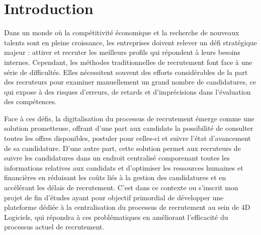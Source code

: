 \chapter*{Introduction}

Dans un monde où la compétitivité économique et la recherche 
de nouveaux talents sont en pleine croissance, les 
entreprises doivent relever un défi stratégique majeur : 
attirer et recruter les meilleurs profils qui répondent à 
leurs besoins internes. Cependant, les méthodes 
traditionnelles de recrutement font face à une série de 
difficultés. Elles nécessitent souvent des efforts 
considérables de la part des recruteurs pour examiner 
manuellement un grand nombre de candidatures, ce qui expose 
à des risques d'erreurs, de retards et d'imprécisions dans 
l'évaluation des compétences. 
\newline

Face à ces défis, la digitalisation du processus de recrutement émerge comme une
solution prometteuse, offrant d’une part aux candidats la possibilité de consulter toutes les
offres disponibles, postuler pour celles-ci et suivre l’état d’avancement de sa candidature.
D’une autre part, cette solution permet aux recruteurs de suivre les candidatures dans un endroit centralisé
comporenant toutes les informations relatives aux candidats et d’optimiser les ressources humaines et financières en réduisant les coûts
liés à la gestion des candidatures et en accélérant les délais de recrutement. C’est dans
ce contexte ou s’inscrit mon projet de fin d’études ayant pour objectif primordial de développer une plateforme dédiée à la centralisation
du processus de recrutement au sein de 4D Logiciels, qui répondra à ces
problématiques en améliorant l’efficacité du processus actuel de recrutement.  
\newline

